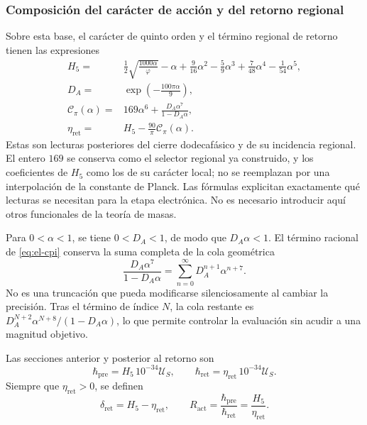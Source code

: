 

\subsubsection{Composición del carácter de acción y del retorno regional}

Sobre esta base, el carácter de quinto orden y el término regional de
retorno tienen las expresiones
\begin{align}
 H_5={}&\frac12\sqrt{\frac{1000\alpha}{\varphi}}-\alpha
   +\frac9{16}\alpha^2-\frac59\alpha^3
   +\frac7{48}\alpha^4-\frac1{54}\alpha^5,
   \label{eq:el-h5}\\
 D_A={}&\exp\!\left(-\frac{100\pi\alpha}{9}\right),
   \label{eq:el-da}\\
 \mathcal C_\pi(\alpha)={}&169\alpha^6+
       \frac{D_A\alpha^7}{1-D_A\alpha},
   \label{eq:el-cpi}\\
 \eta_{\mathrm{ret}}={}&H_5-\frac{90}{\pi}\mathcal C_\pi(\alpha).
   \label{eq:el-eta}
\end{align}
Estas son lecturas posteriores del cierre dodecafásico y de su
incidencia regional. El entero \(169\) se conserva como el selector
regional ya construido, y los coeficientes de \(H_5\) como los de su
carácter local; no se reemplazan por una interpolación de la constante de
Planck. Las fórmulas explicitan exactamente qué lecturas se necesitan
para la etapa electrónica. No es necesario introducir aquí otros
funcionales de la teoría de masas.

Para \(0<\alpha<1\), se tiene \(0<D_A<1\), de modo que
\(D_A\alpha<1\). El término racional de \eqref{eq:el-cpi} conserva la
suma completa de la cola geométrica
\begin{equation}
 \frac{D_A\alpha^7}{1-D_A\alpha}
 =\sum_{n=0}^{\infty}D_A^{n+1}\alpha^{n+7}.
 \label{eq:el-cola-regional}
\end{equation}
No es una truncación que pueda modificarse silenciosamente al cambiar la
precisión. Tras el término de índice \(N\), la cola restante es
\(D_A^{N+2}\alpha^{N+8}/(1-D_A\alpha)\), lo que permite controlar la
evaluación sin acudir a una magnitud objetivo.

\begin{definition}
Las secciones anterior y posterior al retorno son
\begin{equation}
 \hbar_{\mathrm{pre}}=H_5\,10^{-34}\mathcal U_S,
 \qquad
 \hbar_{\mathrm{ret}}=\eta_{\mathrm{ret}}\,10^{-34}\mathcal U_S.
 \label{eq:el-secciones-accion}
\end{equation}
Siempre que \(\eta_{\mathrm{ret}}>0\), se definen
\begin{equation}
 \delta_{\mathrm{ret}}=H_5-\eta_{\mathrm{ret}},\qquad
 R_{\mathrm{act}}=\frac{\hbar_{\mathrm{pre}}}{\hbar_{\mathrm{ret}}}
 =\frac{H_5}{\eta_{\mathrm{ret}}}.
 \label{eq:el-ratio}
\end{equation}
\end{definition}

